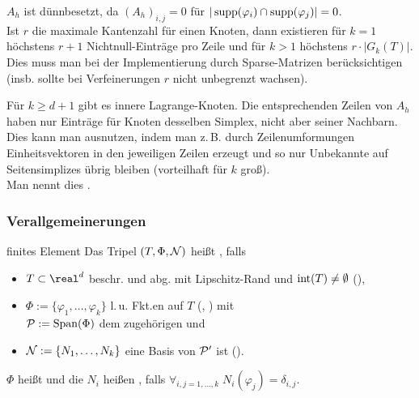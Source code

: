 \linie

\begin{Bem}
    $A_h$ ist dünnbesetzt,
    da $(A_h)_{i,j} = 0$ für $|\supp(\varphi_i) \cap \supp(\varphi_j)| = 0$.\\
    Ist $r$ die maximale Kantenzahl für einen Knoten,
    dann existieren für $k = 1$ höchstens $r + 1$ Nichtnull-Einträge pro Zeile und
    für $k > 1$ höchstens $r \cdot |G_k(T)|$.\\
    Dies muss man bei der Implementierung durch Sparse-Matrizen berücksichtigen
    (insb. sollte bei Verfeinerungen $r$ nicht unbegrenzt wachsen).
\end{Bem}

\begin{Bem}
    Für $k \ge d+1$ gibt es innere Lagrange-Knoten.
    Die entsprechenden Zeilen von $A_h$ haben nur Einträge für Knoten desselben Simplex,
    nicht aber seiner Nachbarn.
    Dies kann man ausnutzen, indem man z.\,B. durch Zeilenumformungen Einheitsvektoren
    in den jeweiligen Zeilen erzeugt und so nur Unbekannte auf Seitensimplizes übrig bleiben
    (vorteilhaft für $k$ groß).\\
    Man nennt dies .
\end{Bem}

\pagebreak

\subsubsection{%
    Verallgemeinerungen%
}

\begin{Def}{finites Element}
    Das Tripel $(T, \Phi, \N)$ heißt , falls
    \begin{itemize}
        \item
        $T \subset \real^d$ beschr. und abg. mit Lipschitz-Rand und $\interior(T) \not= \emptyset$
        (),
        
        \item
        $\Phi := \{\varphi_1, \dotsc, \varphi_k\}$ l.\,u. Fkt.en auf $T$
        (, ) mit\\
        $\P := \Span(\Phi)$ dem zugehörigen  und
        
        \item
        $\N := \{N_1, \dotsc, N_k\}$
        eine Basis von $\P'$ ist ().
    \end{itemize}
    $\Phi$ heißt  und die $N_i$ heißen ,
    falls $\forall_{i,j=1,\dotsc,k}\; N_i(\varphi_j) = \delta_{i,j}$.
\end{Def}

